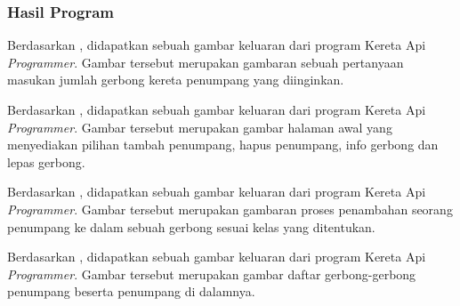 \documentclass[../main.tex]{subfiles}
\begin{document}
\subsubsection{Hasil Program}


\begin{indentpar}
    \hspace{\parindent}Berdasarkan , didapatkan sebuah gambar keluaran dari program Kereta Api \textit{Programmer}. Gambar tersebut merupakan gambaran sebuah pertanyaan masukan jumlah gerbong kereta penumpang yang diinginkan.
\end{indentpar}


\begin{indentpar}
    \hspace{\parindent}Berdasarkan , didapatkan sebuah gambar keluaran dari program Kereta Api \textit{Programmer}. Gambar tersebut merupakan gambar halaman awal yang menyediakan pilihan tambah penumpang, hapus penumpang, info gerbong dan lepas gerbong.
\end{indentpar}


\begin{indentpar}
    \hspace{\parindent}Berdasarkan , didapatkan sebuah gambar keluaran dari program Kereta Api \textit{Programmer}. Gambar tersebut merupakan gambaran proses penambahan seorang penumpang ke dalam sebuah gerbong sesuai kelas yang ditentukan.
\end{indentpar}
\blanktop
{}

\begin{indentpar}
    \hspace{\parindent}Berdasarkan , didapatkan sebuah gambar keluaran dari program Kereta Api \textit{Programmer}. Gambar tersebut merupakan gambar daftar gerbong-gerbong penumpang beserta penumpang di dalamnya.
\end{indentpar}

\end{document}
